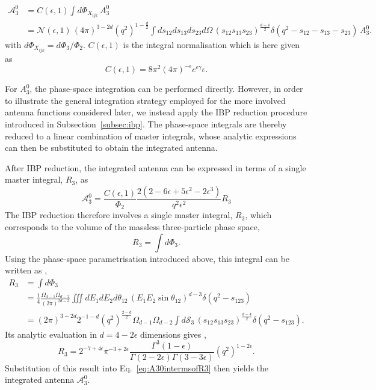 \begin{equation}
    \begin{split}
        \mathcal A_3^0 &= C(\epsilon,1)\int d\Phi_{X_{ijk}}\,A_3^0\\
                       &= \mathcal N(\epsilon,1)\,(4\pi)^{3-2d}\left(q^2\right)^{1-\frac d2}\int ds_{12}ds_{13}ds_{23}d\Omega\,(s_{12}s_{13}s_{23})^{\frac{d-4}{2}}\delta\left(q^2-s_{12}-s_{13}-s_{23}\right)\,A_3^0.
    \end{split}
\end{equation}
with $d\Phi_{X_{ijk}} = d\Phi_3/\Phi_2$.
$C(\epsilon,1)$ is the integral normalisation which is here given as 
\begin{equation}
    C(\epsilon,1) = 8\pi^2(4\pi)^{-\epsilon}e^{\epsilon\gamma_E}.
\end{equation}

For $A_3^0$, the phase-space integration can be performed directly. However, in order to illustrate
the general integration strategy employed for the more involved antenna functions considered later,
we instead apply the IBP reduction procedure introduced in Subsection~\ref{subsec:ibp}. The
phase-space integrals are thereby reduced to a linear combination of master integrals, whose analytic
expressions can then be substituted to obtain the integrated antenna.

After IBP reduction, the integrated antenna can be expressed in terms of a single master integral, $R_3$, as
\begin{equation}\label{eq:A30intermsofR3}
    \mathcal A_3^0 = \frac{C(\epsilon,1)}{\Phi_2}\frac{2(2-6\epsilon+5\epsilon^2-2\epsilon^3)}{q^2\epsilon^2}R_3
\end{equation}
The IBP reduction therefore involves a single master integral, $R_3$, which corresponds to the volume
of the massless three-particle phase space,
\begin{equation}
    R_3 = \int d\Phi_3.
\end{equation}
Using the phase-space parametrisation introduced above, this integral can be written as
\cite{TM_JoanaReis},
\begin{equation}
    \begin{split}
        R_3 &= \int d\Phi_3\\
            &= \frac14\frac{\Omega_{d-1}\Omega_{d-2}}{(2\pi)^{2d-3}}\iiint dE_1dE_2d\theta_{12}\,(E_1E_2\sin\theta_{12})^{d-3}\delta\!\left(q^2-s_{123}\right)\\
            &= (2\pi)^{3-2d}2^{-1-d}\left(q^2\right)^{\frac{2-d}{2}}\Omega_{d-1}\Omega_{d-2}\int d\mathcal S_3\,(s_{12}s_{13}s_{23})^{\frac{d-4}{2}}\delta\!\left(q^2-s_{123}\right).
    \end{split}
\end{equation}
Its analytic evaluation in $d=4-2\epsilon$ dimensions gives \cite{GehrmannDeRidder0311276},
\begin{equation}\label{eq:R3}
    R_3 = 2^{-7+4\epsilon}\pi^{-3+2\epsilon}\frac{\Gamma^3(1-\epsilon)}{\Gamma(2-2\epsilon)\Gamma(3-3\epsilon)}\!\left(q^2\right)^{1-2\epsilon}.
\end{equation}
Substitution of this result into Eq.~\eqref{eq:A30intermsofR3} then yields the integrated antenna
$\mathcal A_3^0$.

